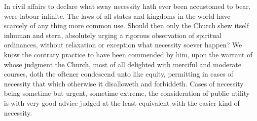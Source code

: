 In civil affairs to declare what sway necessity hath ever been accustomed to bear, were labour infinite. The laws of all states and kingdoms in the world have scarcely of any thing more common use. Should then only the Church shew itself inhuman and stern, absolutely urging a rigorous observation of spiritual ordinances, without relaxation or exception what necessity soever happen? We know the contrary practice to have been commended by him, upon the warrant of whose judgment the Church, most of all delighted with merciful and moderate courses, doth the oftener condescend unto like equity, permitting in cases of necessity that which otherwise it disalloweth and forbiddeth.
Cases of necessity being sometime but urgent, sometime extreme, the consideration of public utility is with very good  advice judged at the least equivalent with the easier kind of necessity.
